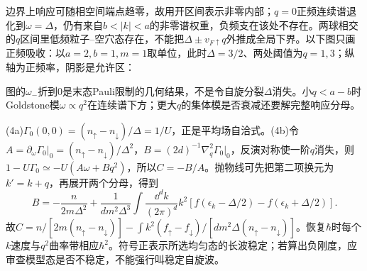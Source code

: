 \begin{solution}
边界上响应可随相空间端点趋零，故用开区间表示非零内部；$q=0$正频连续谱退化到$\omega=\Delta$，仍有来自$b<|k|<a$的非零谱权重，负频支在该处不存在。两球相交的$q$区间里低频粒子--空穴态存在，不能把$\Delta\pm v_{F\uparrow}q$外推成全局下界。以下图只画正频吸收：以$a=2,b=1,m=1$取单位，此时$\Delta=3/2$、两处阈值为$q=1,3$；纵轴为正频率，阴影是允许区：
\begin{center}
\end{center}
图的$\omega_-$折到0是末态Pauli限制的几何结果，不是令自旋分裂$\Delta$消失。小$q<a-b$时Goldstone模$\omega\propto q^2$在连续谱下方；更大$q$的集体模是否衰减还要解完整响应分母。

(4a)$\Gamma_0(0,0)=(n_\uparrow-n_\downarrow)/\Delta=1/U$，正是平均场自洽式。(4b)令$A=\partial_\omega\Gamma_0|_0=(n_\uparrow-n_\downarrow)/\Delta^2$，$B=(2d)^{-1}\nabla_q^2\Gamma_0|_0$，反演对称使一阶$q$消失，则$1-U\Gamma_0\simeq-U(A\omega+Bq^2)$，所以$C=-B/A$。抛物线可先把第二项换元为$k'=k+q$，再展开两个分母，得到
\begin{equation}
B=-\frac{n}{2m\Delta^2}+\frac1{d m^2\Delta^3}\int\frac{\dd^dk}{(2\pi)^d}k^2[f(\epsilon_k-\Delta/2)-f(\epsilon_k+\Delta/2)].
\end{equation}
故$C=n/[2m(n_\uparrow-n_\downarrow)]-\int k^2(f_\uparrow-f_\downarrow)/[d m^2\Delta(n_\uparrow-n_\downarrow)]$。恢复$\hbar$时每个$k$速度与$q^2$曲率带相应$\hbar^2$。符号正表示所选均匀态的长波稳定；若算出负刚度，应审查模型态是否不稳定，不能强行叫稳定自旋波。
\end{solution}
